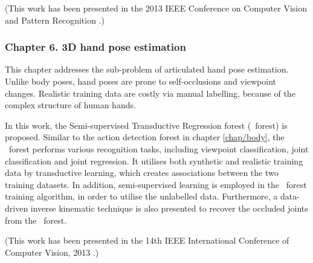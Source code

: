 (This work has been presented in the 2013 IEEE Conference on Computer Vision and Pattern Recognition \cite{Yu2013}.)  

\subsubsection*{Chapter 6. 3D hand pose estimation} 

This chapter addresses the sub-problem of articulated hand pose estimation.  Unlike body poses, hand poses are prone to self-occlusions and viewpoint changes. Realistic training data are costly via manual labelling, because of the complex structure of human hands. 

In this work, the Semi-supervised Transductive Regression forest (\STR\ forest) is proposed. Similar to the action detection forest in chapter \ref{chap/body}, the \STR\ forest performs various recognition tasks, including viewpoint classification, joint classification and joint regression. It utilises both synthetic and realistic training data by transductive learning, which creates associations between the two training datasets. In addition, semi-supervised learning is employed in the \STR\ forest training algorithm, in order to utilise the unlabelled data.
Furthermore, a data-driven inverse kinematic technique is also presented to recover the occluded joints from the \STR\ forest.

(This work has been presented in the 14th IEEE International Conference of Computer Vision, 2013 \cite{Tang2013}.)
